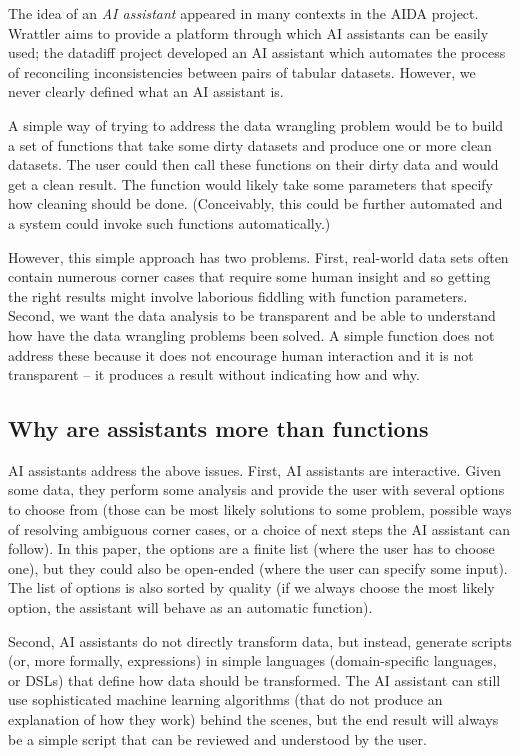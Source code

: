 \documentclass{article}
\begin{document}
The idea of an \emph{AI assistant} appeared in many contexts in the AIDA project.
Wrattler aims to provide a platform through which AI assistants can be 
easily used; the datadiff project developed an AI assistant which automates the process of 
reconciling inconsistencies between pairs of tabular datasets. However, we never clearly defined
what an AI assistant is. 

A simple way of trying to address the data wrangling problem would be to build a set of functions
that take some dirty datasets and produce one or more clean datasets. The user could then call these
functions on their dirty data and would get a clean result. The function would likely take some
parameters that specify how cleaning should be done. (Conceivably, this could be further automated
and a system could invoke such functions automatically.)

However, this simple approach has two problems. First, real-world data sets often 
contain numerous corner cases that require some human insight and so getting the right results 
might involve laborious fiddling with function parameters. Second, we want the data analysis
to be transparent and be able to understand how have the data wrangling problems been solved. 
A simple function does not address these because it does not encourage human interaction
and it is not transparent -- it produces a result without indicating how and why.

\subsection{Why are assistants more than functions}

AI assistants address the above issues. First, AI assistants are interactive. Given 
some data, they perform some analysis and provide the user with several options to choose 
from (those can be most likely solutions to some problem, possible ways of resolving ambiguous
corner cases, or a choice of next steps the AI assistant can follow). In this paper, the options are 
a finite list (where the user has to choose one), but they could also be open-ended (where the user 
can specify some input). The list of options is also sorted by quality (if we always choose the 
most likely option, the assistant will behave as an automatic function).

Second, AI assistants do not directly transform data, but instead, generate scripts (or, more 
formally, expressions) in simple languages (domain-specific languages, or DSLs) that define how 
data should be transformed. The AI assistant can still use sophisticated machine learning 
algorithms (that do not produce an explanation of how they work) behind the scenes, but the end
result will always be a simple script that can be reviewed and understood by the user.
\end{document}
